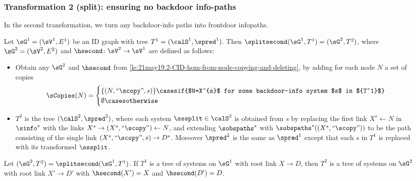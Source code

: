 \subsubsection{Transformation 2 (split): ensuring no backdoor info-paths}
In the second transformation, we turn any backdoor-info paths into frontdoor infopaths.



\begin{definition}[Transformation 2]
\label{def:21jan28.1-third-split-to-ensure-new-appropriateness}
Let $\sG^1=(\sV^1,E^1)$ be an ID graph with tree $T^1=(\calS^1,\spred^1)$. Then $\splitsecond(\sG^1,T^1)=(\sG^2, T^2)$, where $\sG^2=(\sV^2,E^2)$ and $\hsecond\colon\sV^2 \to \sV^1$ are defined as follows:~
\begin{itemize}
    \item Obtain any $\sG^2$ and $\hsecond$ from \autoref{le:21may19.2-CID-hom-from-node-copying-and-deleting}, by adding for each node $N$ a set of copies
    \[\sCopies(N) = \begin{cases} 
        \{(N,``\scopy", s)\} \casesif {$N=X^{s}$ for some backdoor-info system $s$ in ${T^1}$}\\
        \emptyset \casesotherwise
    \end{cases}\]
    
    
    
    \item \sloppy $T^2$ is the tree $(\calS^2,\spred^2)$, where each system $\sssplit\in \calS^2$ is obtained from $s$ by replacing the first link $X^s\gets N$ in $\sinfo^s$ with the links $X^s\to (X^s,``\scopy")\gets N$, and extending $\sobspaths^s$ with $\sobspaths^s((X^s,``\scopy"))$ to be the path consisting of the single link $(X^s,``\scopy", s)\to D^s$. Moreover $\spred^2$ is the same as $\spred^1$ except that each $s$ in $T^1$ is replaced with its transformed $\sssplit$. 
\end{itemize}
\end{definition}


    
    
    







\begin{lemma}\label{le:21jan28.3-third-split-preserves-tree}
Let $(\sG^2, T^2)=\splitsecond(\sG^1,T^1)$. If $T^1$ is a tree of systems on $\sG^1$ with root link $X\to D$, then $T^2$ is a tree of systems on $\sG^2$ with root link $X'\to D'$ with $\hsecond(X')=X$ and $\hsecond(D')=D$.
\end{lemma}

